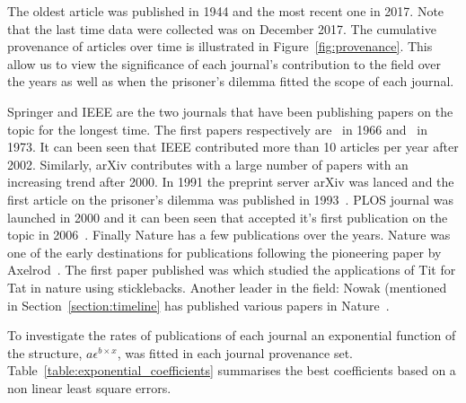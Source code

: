 \documentclass{article}
\begin{document}
The oldest article was published in 1944 and the most recent one in 2017. Note
that the last time data were collected was on December 2017.
The cumulative provenance of articles over time is illustrated
in Figure~\ref{fig:provenance}. This allow us to view the significance of each
journal's contribution to the field over the years as well as when the prisoner's
dilemma fitted the scope of each journal.

Springer and IEEE are the two journals that have been publishing papers on the
topic for the longest time. The first papers respectively are~\cite{Evans1966} in
1966 and~\cite{4045089} in 1973.
It can been seen that IEEE contributed more than 10 articles per year after 2002.
Similarly, arXiv contributes with a large number of papers with an increasing trend
after 2000. In 1991 the preprint server arXiv was lanced and the first article on
the prisoner's dilemma was published in 1993~\cite{Huberman1993}.
PLOS journal was launched in 2000 and it can been seen that accepted it's first
publication on the topic in 2006~\cite{0020178}. Finally Nature has a few publications over the
years. Nature was one of the early destinations for publications following the
pioneering paper by Axelrod~\cite{Axelrod1984}. The first paper published was
\cite{Milinski1987} which studied the applications of Tit for Tat in nature
using sticklebacks. Another leader in the field: Nowak (mentioned in Section~\ref{section:timeline}
has published various papers in Nature~\cite{Nowak1993, Nowak1992}.

To investigate the rates of publications of each journal an exponential function
of the structure, \(a \epsilon^{b \times x}\), was fitted in each journal
provenance set. Table~\ref{table:exponential_coefficients} summarises the best coefficients based on a non
linear least square errors.
\end{document}

